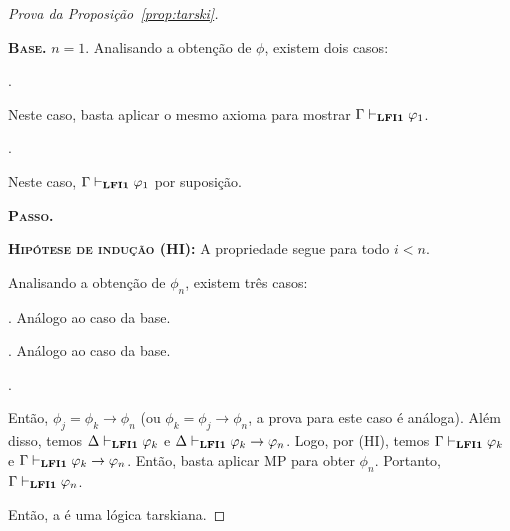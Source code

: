 \begin{proof}[Prova da Proposição~\ref{prop:tarski}]
\begin{adjustwidth}{1cm}{}
                \begin{adjustwidth}{1cm}{}
                    
                    \textbf{\textsc{Base.}} $n = 1$.
                    Analisando a obtenção de $\phi$, existem dois casos:
                    \begin{provaporcasos}
                    . 
                    
                    Neste caso, basta aplicar o mesmo axioma para mostrar $\Gamma \vdash_{{\normalfont\textbf{LFI1}}{}} \varphi_1$.
                    
                    \casodeprova{$\phi_1 \in \Delta$}. 
                    
                    Neste caso, $\Gamma \vdash_{{\normalfont\textbf{LFI1}}{}} \varphi_1$ por suposição.
                \end{provaporcasos}

                \noindent\textbf{\textsc{Passo.}} 
                
                \noindent \textbf{\textsc{Hipótese de indução (HI):}} A propriedade segue para todo $i < n$.

                Analisando a obtenção de $\phi_n$, existem três casos:
                \begin{provaporcasos}
                    . Análogo ao caso da base.
                    
                    . Análogo ao caso da base.
                    
                    .
                    
                    Então, $\phi_j = \phi_k \to \phi_n$ (ou $\phi_k = \phi_j \to \phi_n$, a prova para este caso é análoga). Além disso, temos $\Delta \vdash_{{\normalfont\textbf{LFI1}}{}} \varphi_k$ e $\Delta \vdash_{{\normalfont\textbf{LFI1}}{}} \varphi_k \to \varphi_n$. Logo, por (HI), temos $\Gamma \vdash_{{\normalfont\textbf{LFI1}}{}} \varphi_k$ e $\Gamma \vdash_{{\normalfont\textbf{LFI1}}{}} \varphi_k \to \varphi_n$. Então, basta aplicar MP para obter $\phi_n$. Portanto, $\Gamma \vdash_{{\normalfont\textbf{LFI1}}{}} \varphi_n$.
                \end{provaporcasos}
            \end{adjustwidth}
        \end{adjustwidth}

            Então, a \lfium{} é uma lógica tarskiana. \qedhere
            
        \end{proof}

